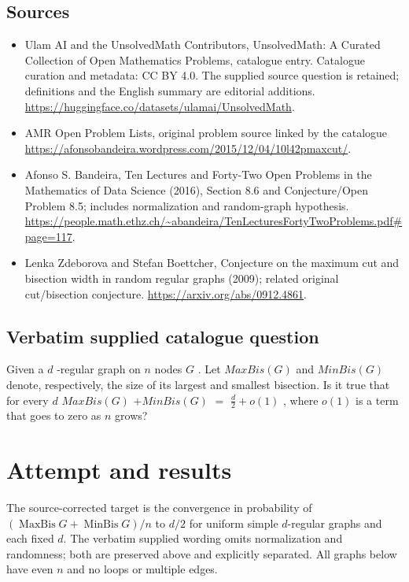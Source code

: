 \documentclass[11pt]{article}
\begin{document}
\subsection{Sources}
\begin{itemize}
\item[S1] Ulam AI and the UnsolvedMath Contributors, UnsolvedMath: A Curated Collection of Open Mathematics Problems, catalogue entry. Catalogue curation and metadata: CC BY 4.0. The supplied source question is retained; definitions and the English summary are editorial additions.
\url{https://huggingface.co/datasets/ulamai/UnsolvedMath}.
\item[S2] AMR Open Problem Lists, original problem source linked by the catalogue
\url{https://afonsobandeira.wordpress.com/2015/12/04/10l42pmaxcut/}.
\item[S3] Afonso S. Bandeira, Ten Lectures and Forty-Two Open Problems in the Mathematics of Data Science (2016), Section 8.6 and Conjecture/Open Problem 8.5; includes normalization and random-graph hypothesis.
\url{https://people.math.ethz.ch/~abandeira/TenLecturesFortyTwoProblems.pdf#page=117}.
\item[S4] Lenka Zdeborova and Stefan Boettcher, Conjecture on the maximum cut and bisection width in random regular graphs (2009); related original cut/bisection conjecture.
\url{https://arxiv.org/abs/0912.4861}.
\end{itemize}
\subsection{Verbatim supplied catalogue question}
Given a $d$ -regular graph on $n$ nodes $G$ . Let $MaxBis(G)$ and $MinBis(G)$ denote, respectively, the size of its largest and smallest bisection. Is it true that for every $d$ $MaxBis(G)$ $+ MinBis(G)$ $=$ $\frac{d}{2} + o(1)$ , where $o(1)$ is a term that goes to zero as $n$ grows?

\section{Attempt and results}
The source-corrected target is the convergence in probability of
$(\operatorname{MaxBis}G+\operatorname{MinBis}G)/n$ to $d/2$ for uniform
simple $d$-regular graphs and each fixed $d$. The verbatim supplied wording
omits normalization and randomness; both are preserved above and explicitly
separated. All graphs below have even $n$ and no loops or multiple edges.
\end{document}
